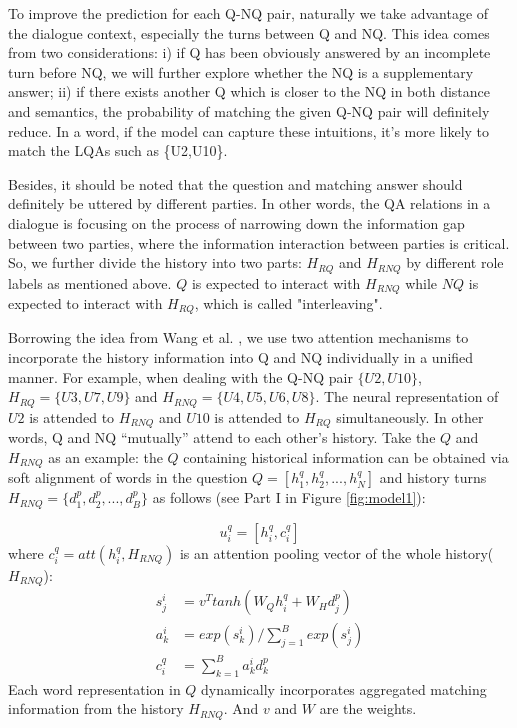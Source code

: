 To improve the prediction for each Q-NQ pair, 
naturally we take advantage of the dialogue context, 
especially the turns between Q and NQ. 
This idea comes from two considerations: i) if Q has been obviously answered 
by an incomplete turn before NQ, we will further explore whether the NQ 
is a supplementary answer; ii) if there exists another Q which is closer 
to the NQ in both distance and semantics, the probability of matching 
the given Q-NQ pair will definitely reduce. In a word, 
if the model can capture these intuitions, it's more likely to match 
the LQAs such as \{U2,U10\}.

Besides, it should be noted that the question and matching answer should
definitely be uttered by different parties. 
In other words, the QA relations in a dialogue is focusing 
on the process of narrowing down the information gap between two parties, 
where the information interaction between parties is critical. 
So, we further divide the history into two parts: 
$H_{RQ}$ and $H_{RNQ}$ by different role labels as mentioned above. 
$Q$ is expected to interact with $H_{RNQ}$ while $NQ$ is expected to interact with $H_{RQ}$, which is called "interleaving".

Borrowing the idea from Wang et al. , we use two attention mechanisms to incorporate the history information into Q and NQ individually in a unified manner. For example, when dealing with the Q-NQ pair $\{U2,U10\}$, $H_{RQ}=\{U3,U7,U9\}$ and $H_{RNQ}=\{U4,U5,U6,U8\}$. The neural representation of $U2$ is attended to $H_{RNQ}$ and $U10$ is attended to $H_{RQ}$ simultaneously.
In other words, Q and NQ ``mutually'' attend to each other's history. 
Take the $Q$ and $H_{RNQ}$ as an example: the $Q$ containing historical information can be obtained  via soft alignment of words in the question $Q=[h^q_1,h^q_2,...,h^q_N]$ and history turns $H_{RNQ}=\{d^p_1,d^p_2,...,d^p_B\}$ as follows (see Part I in Figure \ref{fig:model1}):

\begin{equation}
u^q_i=[h^q_i,c^q_i]
\end{equation}
where $c^q_i=att(h^q_i,H_{RNQ})$ is an attention pooling vector of the whole history($H_{RNQ}$):
\begin{equation}
\begin{aligned}
s^i_j&=v^Ttanh(W_Qh^q_i+W_Hd^p_j)\\
a^i_k&=exp(s^i_k)/\sum_{j=1}^Bexp(s^i_j)\\
c^q_i&=\sum_{k=1}^Ba^i_kd^p_k
\end{aligned}
\end{equation}
Each word representation in $Q$ dynamically incorporates aggregated matching information from the history $H_{RNQ}$. And $v$ and $W$ are the weights.


